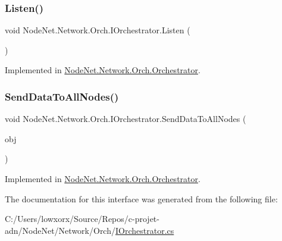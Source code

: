 \subsubsection{\texorpdfstring{Listen()}{Listen()}}
{\footnotesize\ttfamily void Node\+Net.\+Network.\+Orch.\+I\+Orchestrator.\+Listen (\begin{DoxyParamCaption}{ }\end{DoxyParamCaption})}



Implemented in \hyperlink{class_node_net_1_1_network_1_1_orch_1_1_orchestrator_a3adf37c5b27377234431ecdec0a2dc98}{Node\+Net.\+Network.\+Orch.\+Orchestrator}.

\mbox{\label{interface_node_net_1_1_network_1_1_orch_1_1_i_orchestrator_affcb97b9f7365e03c5604a763f703ae2}} 
\subsubsection{\texorpdfstring{Send\+Data\+To\+All\+Nodes()}{SendDataToAllNodes()}}
{\footnotesize\ttfamily void Node\+Net.\+Network.\+Orch.\+I\+Orchestrator.\+Send\+Data\+To\+All\+Nodes (\begin{DoxyParamCaption}\item[{\hyperlink{class_node_net_1_1_data_1_1_data_input}{Data\+Input}}]{obj }\end{DoxyParamCaption})}



Implemented in \hyperlink{class_node_net_1_1_network_1_1_orch_1_1_orchestrator_ad866995c960161d951c53c62cd4c446a}{Node\+Net.\+Network.\+Orch.\+Orchestrator}.



The documentation for this interface was generated from the following file\+:\begin{DoxyCompactItemize}
\item 
C\+:/\+Users/lowxorx/\+Source/\+Repos/c-\/projet-\/adn/\+Node\+Net/\+Network/\+Orch/\hyperlink{_i_orchestrator_8cs}{I\+Orchestrator.\+cs}\end{DoxyCompactItemize}
